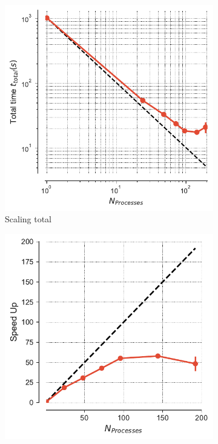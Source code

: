 \begin{figure}[!htb]
\centering
\begin{subfigure}{.4\textwidth}
  \includegraphics[width=\linewidth]{figures/tot_time_traj_splitting_chain-reader.pdf}
  \caption{Scaling total}
  \label{fig:MPItottime-chain-reader}
\end{subfigure}
\hfill
\begin{subfigure}{.4\textwidth}
  \includegraphics[width=\linewidth]{figures/Speed_UP_traj_splitting_chain-reader.pdf}

\end{subfigure}
\end{figure}
